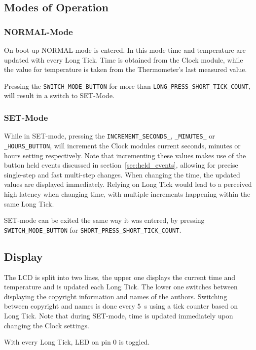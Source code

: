 \subsection{Modes of Operation}

\subsubsection{NORMAL-Mode}

On boot-up NORMAL-mode is entered. In this mode time and temperature are updated with every Long Tick. Time is obtained from the Clock module, while the value for temperature is taken from the Thermometer's last measured value.

Pressing the \texttt{SWITCH\_MODE\_BUTTON} for more than \texttt{LONG\_PRESS\_SHORT\_TICK\_COUNT}, will result in a switch to SET-Mode.

\subsubsection{SET-Mode}

While in SET-mode, pressing the \texttt{INCREMENT\_SECONDS\_}, \texttt{\_MINUTES\_} or \texttt{\_HOURS\_BUTTON}, will increment the Clock modules current seconds, minutes or hours setting respectively. Note that incrementing these values makes use of the button held events discussed in section~\ref{sec:held_events}, allowing for precise single-step and fast multi-step changes.
When changing the time, the updated values are displayed immediately. Relying on Long Tick would lead to a perceived high latency when changing time, with multiple increments happening within the same Long Tick.

SET-mode can be exited the same way it was entered, by pressing \texttt{SWITCH\_MODE\_BUTTON} for \texttt{SHORT\_PRESS\_SHORT\_TICK\_COUNT}.

\subsection{Display}

The LCD is split into two lines, the upper one displays the current time and temperature and is updated each Long Tick. The lower one switches between displaying the copyright information and names of the authors. Switching between copyright and names is done every \SI{5}{\second} using a tick counter based on Long Tick. Note that during SET-mode, time is updated immediately upon changing the Clock settings.

With every Long Tick, LED on pin 0 is toggled.
